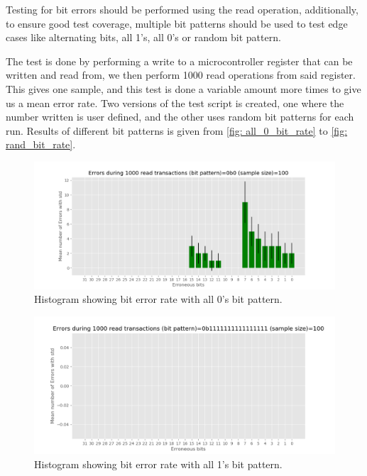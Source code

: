 \documentclass[main.tex]{subfiles}
\begin{document}
Testing for bit errors should be performed using the read operation, additionally, to ensure good test coverage, multiple bit patterns should be used to test edge cases like alternating bits, all 1's, all 0's or random bit pattern.

The test is done by performing a write to a microcontroller register that can be written and read from, we then perform 1000 read operations from said register. This gives one sample, and this test is done a variable amount more times to give us a mean error rate. Two versions of the test script is created, one where the number written is user defined, and the other uses random bit patterns for each run. Results of different bit patterns is given from \autoref{fig: all_0_bit_rate} to \ref{fig: rand_bit_rate}.

\begin{figure}[!ht]
    \centering
    \includegraphics[width=18cm]{images/error_rate_all_0s.png}
    \caption{Histogram showing bit error rate with all 0's bit pattern.}
    \label{fig: all_0_bit_rate}
\end{figure}
\FloatBarrier

\begin{figure}[!ht]
    \centering
    \includegraphics[width=18cm]{images/error_rate_all_1s.png}
    \caption{Histogram showing bit error rate with all 1's bit pattern.}
    \label{fig: all_1_bit_rate}
\end{figure}
\FloatBarrier
\end{document}
